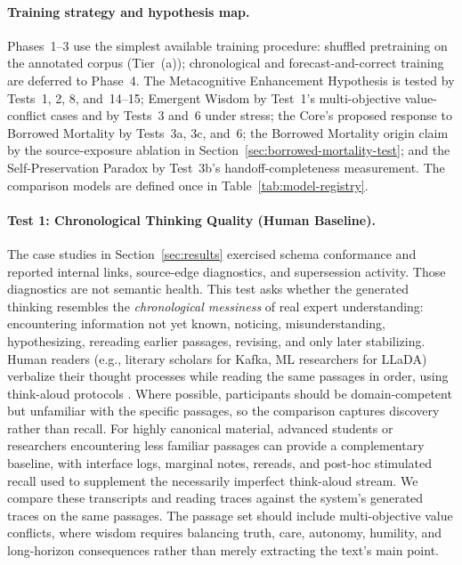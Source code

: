 \paragraph{Training strategy and hypothesis map.} Phases~1--3 use the
simplest available training procedure: shuffled pretraining on the annotated
corpus (Tier~(a)); chronological and forecast-and-correct training are deferred
to Phase~4. The Metacognitive Enhancement Hypothesis is tested by Tests~1, 2,
8, and~14--15; Emergent Wisdom by Test~1's
multi-objective value-conflict cases and by Tests~3 and~6 under stress;
the Core's proposed response to Borrowed Mortality by Tests~3a, 3c, and~6; the
Borrowed Mortality origin claim by the source-exposure ablation in
Section~\ref{sec:borrowed-mortality-test}; and the Self-Preservation Paradox by
Test~3b's handoff-completeness measurement. The comparison models are defined
once in Table~\ref{tab:model-registry}.

\paragraph{Test 1: Chronological Thinking Quality (Human Baseline).}
The case studies in Section~\ref{sec:results} exercised schema
conformance and reported internal links, source-edge diagnostics, and
supersession activity. Those diagnostics are not semantic health. This test asks
whether the generated
thinking resembles the \emph{chronological messiness} of real expert
understanding: encountering information not yet known, noticing,
misunderstanding, hypothesizing, rereading earlier passages, revising, and only
later stabilizing. Human readers (e.g., literary scholars for Kafka, ML
researchers for LLaDA) verbalize their thought processes while reading the
same passages in order, using think-aloud protocols \cite{ericsson1984protocol}.
Where possible, participants should be domain-competent but unfamiliar with the
specific passages, so the comparison captures discovery rather than recall.
For highly canonical material, advanced students or researchers encountering
less familiar passages can provide a complementary baseline, with interface
logs, marginal notes, rereads, and post-hoc stimulated recall used to supplement
the necessarily imperfect think-aloud stream. We compare these transcripts and
reading traces against the system's generated traces on the same passages. The
passage set should include multi-objective value conflicts, where wisdom
requires balancing truth, care, autonomy, humility, and long-horizon
consequences rather than merely extracting the text's main point.

